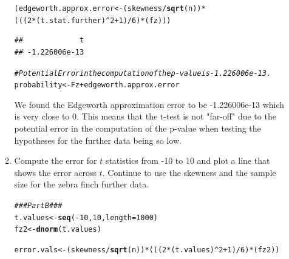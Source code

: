 \documentclass{article}\usepackage[]{graphicx}\usepackage[]{xcolor}
\makeatletter
\newcommand{\hlnum}[1]{\textcolor[rgb]{0.686,0.059,0.569}{#1}}%
\newcommand{\hlcom}[1]{\textcolor[rgb]{0.678,0.584,0.686}{\textit{#1}}}%
\newcommand{\hlopt}[1]{\textcolor[rgb]{0,0,0}{#1}}%
\newcommand{\hldef}[1]{\textcolor[rgb]{0.345,0.345,0.345}{#1}}%
\newcommand{\hlkwb}[1]{\textcolor[rgb]{0.69,0.353,0.396}{#1}}%
\newcommand{\hlkwc}[1]{\textcolor[rgb]{0.333,0.667,0.333}{#1}}%
\newcommand{\hlkwd}[1]{\textcolor[rgb]{0.737,0.353,0.396}{\textbf{#1}}}%
\newenvironment{kframe}{%
 \def\at@end@of@kframe{}%
 \ifinner\ifhmode%
  \def\at@end@of@kframe{\end{minipage}}%
  \begin{minipage}{\columnwidth}%
 \fi\fi%
 \def\FrameCommand##1{\hskip\@totalleftmargin \hskip-\fboxsep
 \colorbox{shadecolor}{##1}\hskip-\fboxsep
     \hskip-\linewidth \hskip-\@totalleftmargin \hskip\columnwidth}%
 \MakeFramed {\advance\hsize-\width
   \@totalleftmargin\z@ \linewidth\hsize
   \@setminipage}}%
 {\par\unskip\endMakeFramed%
 \at@end@of@kframe}
\newenvironment{knitrout}{}{} %
\makeatother
\begin{document}
\begin{enumerate}
\begin{enumerate}
\begin{knitrout}
\begin{kframe}
\begin{alltt}
\hldef{(edgeworth.approx.error} \hlkwb{<-} \hldef{(skewness}\hlopt{/}\hlkwd{sqrt}\hldef{(n))} \hlopt{*}
    \hldef{(((}\hlnum{2}\hlopt{*}\hldef{(t.stat.further)}\hlopt{^}\hlnum{2} \hlopt{+} \hlnum{1}\hldef{)}\hlopt{/}\hlnum{6}\hldef{)}\hlopt{*}\hldef{(fz)))}
\end{alltt}
\begin{verbatim}
##             t 
## -1.226006e-13
\end{verbatim}
\begin{alltt}
\hlcom{# Potential Error in the computation of the p-value is -1.226006e-13.}
\hldef{probability} \hlkwb{<-} \hldef{Fz} \hlopt{+} \hldef{edgeworth.approx.error}
\end{alltt}
\end{kframe}
\end{knitrout}
We found the Edgeworth approximation error to be -1.226006e-13 which is very close to 0. This means that the t-test is not "far-off" due to the potential error in the computation of the p-value when testing the hypotheses for the further data being so low. 
  \item Compute the error for $t$ statistics from -10 to 10 and plot a line
  that shows the error across $t$. Continue to use the skewness and 
  the sample size for the zebra finch further data.
\begin{knitrout}
\color{fgcolor}\begin{kframe}
\begin{alltt}
\hlcom{### Part B ###}
\hldef{t.values} \hlkwb{<-} \hlkwd{seq}\hldef{(}\hlopt{-}\hlnum{10}\hldef{,}\hlnum{10}\hldef{,} \hlkwc{length} \hldef{=} \hlnum{1000}\hldef{)}
\hldef{fz2} \hlkwb{<-} \hlkwd{dnorm}\hldef{(t.values)}

\hldef{error.vals} \hlkwb{<-} \hldef{(skewness}\hlopt{/}\hlkwd{sqrt}\hldef{(n))} \hlopt{*} \hldef{(((}\hlnum{2}\hlopt{*}\hldef{(t.values)}\hlopt{^}\hlnum{2} \hlopt{+} \hlnum{1}\hldef{)}\hlopt{/}\hlnum{6}\hldef{)}\hlopt{*}\hldef{(fz2))}


\end{alltt}
\end{kframe}
\end{knitrout}
\end{enumerate}
\end{enumerate}
\end{document}
